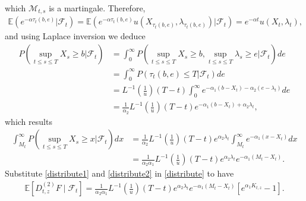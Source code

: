 \documentclass[11pt]{article}
\numberwithin{equation}{section}
\begin{document}
which $\mathcal{M}_{t,s}$ is a martingale. 
Therefore, 
\begin{align*}
\mathbb{E}(e^{-\alpha {\tau}_{t}(b,e)}\vert \mathcal{F}_t)= \mathbb{E}(e^{-\alpha {{\tau}_{t}(b,e)}} u(X_{{\tau}_{t}(b,e)}, \lambda_{{\tau}_{t}(b,e)}) \vert \mathcal{F}_t) =e^{-\alpha t} u(X_{t}, \lambda_{t}),
\end{align*}
and using Laplace inversion we deduce
\begin{align*}
P(\sup_{t \leq s \leq T}X_s \geq b \vert \mathcal{F}_t)& = \int_0^\infty  P(\sup_{t \leq s \leq T}X_s \geq b , \sup_{t \leq s \leq T} \lambda_s \geq e\vert \mathcal{F}_t) de \\
&=\int_0^\infty  P({\tau}_{t}(b,e) \leq T \vert \mathcal{F}_t ) de \\
&=   L^{-1}(\frac{1}{u})(T-t)   \int_0^\infty e^{-\alpha_1 (b-X_t) -\alpha_2(e-\lambda_t)} de\\
&=  \frac{1}{\alpha_2} L^{-1}(\frac{1}{u})(T-t)  e^{-\alpha_1 (b-X_t) +\alpha_2\lambda_t},
\end{align*}
which results
\begin{align}
\int_{M_t}^\infty P(\sup_{t \leq s \leq T}X_s \geq x \vert \mathcal{F}_t)dx& = \frac{1}{\alpha_2} L^{-1}(\frac{1}{u})(T-t)  e^{\alpha_2\lambda_t}   \int_{M_t}^\infty  e^{-\alpha_1 (x-X_t)} dx \nonumber\\
&=  \frac{1}{\alpha_2\alpha_1} L^{-1}(\frac{1}{u})(T-t)  e^{\alpha_2\lambda_t}    e^{-\alpha_1 (M_t-X_t)}. \label{distribute2}
\end{align}
Substitute \eqref{distribute1} and \eqref{distribute2} in \eqref{distribute} to have
\begin{align*}
\mathbb{E}\left[D_{t, z}^{(2)} F \mid \mathcal{F}_{t}\right]= \frac{1}{\alpha_2\alpha_1} L^{-1}(\frac{1}{u})(T-t)  e^{\alpha_2\lambda_t}  e^{-\alpha_1 (M_t-X_t)} [e^{\alpha_1 K_{t,z}}-1].
\end{align*}

\end{document}
